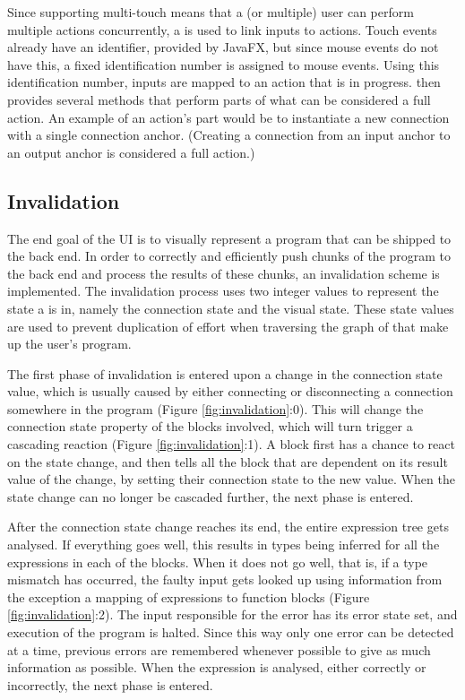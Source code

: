 Since supporting multi-touch means that a (or multiple) user can perform multiple actions concurrently, a  is used to link inputs to actions. Touch events already have an identifier, provided by JavaFX, but since mouse events do not have this, a fixed identification number is assigned to mouse events. Using this identification number, inputs are mapped to an action that is in progress.  then provides several methods that perform parts of what can be considered a full action. An example of an action's part would be to instantiate a new connection with a single connection anchor. (Creating a connection from an input anchor to an output anchor is considered a full action.)

\subsection{Invalidation}
The end goal of the UI is to visually represent a program that can be shipped to the back end. In order to correctly and efficiently push chunks of the program to the back end and process the results of these chunks, an invalidation scheme is implemented. The invalidation process uses two integer values to represent the state a  is in, namely the connection state and the visual state. These state values are used to prevent duplication of effort when traversing the graph of  that make up the user's program.

The first phase of invalidation is entered upon a change in the connection state value, which is usually caused by either connecting or disconnecting a connection somewhere in the program (Figure \ref{fig:invalidation}:0). This will change the connection state property of the blocks involved, which will turn trigger a cascading reaction (Figure \ref{fig:invalidation}:1). A block first has a chance to react on the state change, and then tells all the block that are dependent on its result value of the change, by setting their connection state to the new value. When the state change can no longer be cascaded further, the next phase is entered.

After the connection state change reaches its end, the entire expression tree gets analysed. If everything goes well, this results in types being inferred for all the expressions in each of the blocks. When it does not go well, that is, if a type mismatch has occurred, the faulty input gets looked up using information from the exception a mapping of expressions to function blocks (Figure \ref{fig:invalidation}:2). The input responsible for the error has its error state set, and execution of the program is halted. Since this way only one error can be detected at a time, previous errors are remembered whenever possible to give as much information as possible. When the expression is analysed, either correctly or incorrectly, the next phase is entered.

